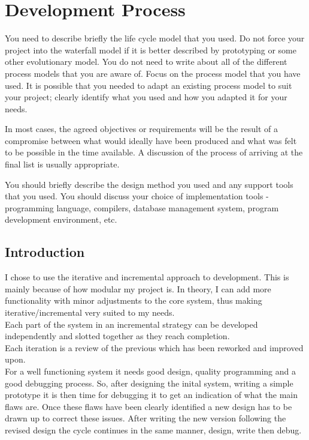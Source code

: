 \chapter{Development Process}

You need to describe briefly the life cycle model that you used. Do not force your project into the waterfall model if it is better described by prototyping or some other evolutionary model. You do not need to write about all of the different process models that you are aware of. Focus on the process model that you have used. It is possible that you needed to adapt an existing process model to suit your project; clearly identify what you used and how you adapted it for your needs.

In most cases, the agreed objectives or requirements will be the result of a compromise between what would ideally have been produced and what was felt to be possible in the time available. A discussion of the process of arriving at the final list is usually appropriate.

You should briefly describe the design method you used and any support tools that you used. You should discuss your choice of implementation tools - programming language, compilers, database management system, program development environment, etc.

\section{Introduction}
I chose to use the iterative and incremental approach to development.  This is mainly because of how modular my project is.  In theory, I can add more functionality with minor adjustments to the core system, thus making iterative/incremental very suited to my needs.
\\Each part of the system in an incremental strategy can be developed independently and slotted together as they reach completion.
\\Each iteration is a review of the previous which has been reworked and improved upon.
\\For a well functioning system it needs good design, quality programming and a good debugging process.  So, after designing the inital system, writing a simple prototype it is then time for debugging it to get an indication of what the main flaws are.  Once these flaws have been clearly identified a new design has to be drawn up to correct these issues.  After writing the new version following the revised design the cycle continues in the same manner, design, write then debug.


